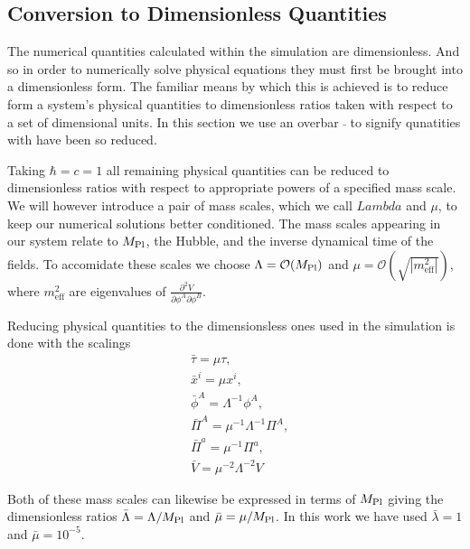 

\subsection{Conversion to Dimensionless Quantities}
The numerical quantities calculated within the simulation are dimensionless. And so in order to numerically solve physical equations they must first be brought into a dimensionless form. The familiar means by which this is achieved is to reduce form a system's physical quantities to dimensionless ratios taken with respect to a set of dimensional units. In this section we use an overbar $\bar{}$ to signify qunatities with have been so reduced.

Taking $\hbar=c=1$ all remaining physical quantities can be reduced to dimensionless ratios with respect to appropriate powers of a specified mass scale. We will however introduce a pair of mass scales, which we call $Lambda$ and $\mu$, to keep our numerical solutions better conditioned. The mass scales appearing in our system relate to $M_{\mathrm{Pl}}$, the Hubble, and the inverse dynamical time of the fields. To accomidate these scales we choose $\Lambda = \mathcal{O}(M_{\mathrm{Pl}})$ and $\mu = \mathcal{O}(\sqrt{|m^2_\mathrm{eff}|})$, where $m^2_\mathrm{eff}$ are eigenvalues of $\frac{\partial^2 V}{\partial\phi^A\partial\phi^B}$.

Reducing physical quantities to the dimensionsless ones used in the simulation is done with the scalings
\begin{align}
  & \bar{\tau} = \mu\tau, \\
  & \bar{x}^i = \mu x^i, \\
  & \bar{\phi}^A = \Lambda^{-1}\phi^A, \\
  & \bar{\Pi}^A = \mu^{-1}\Lambda^{-1}\Pi^A, \\
  & \bar{\Pi}^a = \mu^{-1}\Pi^a, \\
  & \bar{V} = \mu^{-2}\Lambda^{-2}V
\end{align}

Both of these mass scales can likewise be expressed in terms of $M_{\mathrm{Pl}}$ giving the dimensionless ratios $\bar{\Lambda} = \Lambda/M_{\mathrm{Pl}}$ and $\bar{\mu} = \mu/M_{\mathrm{Pl}}$. In this work we have used $\bar{\lambda} = 1$ and $\bar{\mu} = 10^{-5}$.

